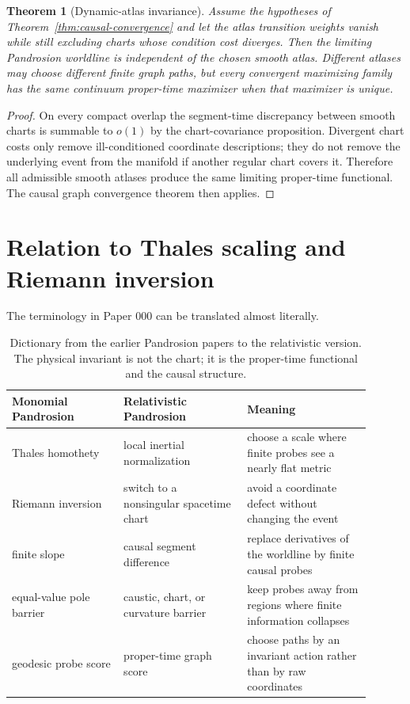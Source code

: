 \documentclass[11pt]{article}
\newtheorem{theorem}[definition]{Theorem}
\begin{document}
\begin{theorem}[Dynamic-atlas invariance]\label{thm:atlas}
Assume the hypotheses of Theorem~\ref{thm:causal-convergence} and let the
atlas transition weights vanish while still excluding charts whose condition
cost diverges.  Then the limiting Pandrosion worldline is independent of the
chosen smooth atlas.  Different atlases may choose different finite graph
paths, but every convergent maximizing family has the same continuum
proper-time maximizer when that maximizer is unique.
\end{theorem}

\begin{proof}
On every compact overlap the segment-time discrepancy between smooth charts is
summable to \(o(1)\) by the chart-covariance proposition.  Divergent chart
costs only remove ill-conditioned coordinate descriptions; they do not remove
the underlying event from the manifold if another regular chart covers it.
Therefore all admissible smooth atlases produce the same limiting proper-time
functional.  The causal graph convergence theorem then applies.
\end{proof}

\section{Relation to Thales scaling and Riemann inversion}

The terminology in Paper 000 can be translated almost literally.

\begin{table}[htbp]
\centering
\renewcommand{\arraystretch}{1.22}
\begin{tabular}{>{\raggedright\arraybackslash}p{0.28\linewidth}>{\raggedright\arraybackslash}p{0.31\linewidth}>{\raggedright\arraybackslash}p{0.31\linewidth}}
\toprule
Monomial Pandrosion & Relativistic Pandrosion & Meaning \\
\midrule
Thales homothety & local inertial normalization & choose a scale where finite probes see a nearly flat metric \\
Riemann inversion & switch to a nonsingular spacetime chart & avoid a coordinate defect without changing the event \\
finite slope & causal segment difference & replace derivatives of the worldline by finite causal probes \\
equal-value pole barrier & caustic, chart, or curvature barrier & keep probes away from regions where finite information collapses \\
geodesic probe score & proper-time graph score & choose paths by an invariant action rather than by raw coordinates \\
\bottomrule
\end{tabular}
\caption{Dictionary from the earlier Pandrosion papers to the relativistic
version.  The physical invariant is not the chart; it is the proper-time
functional and the causal structure.}
\label{tab:dictionary}
\end{table}
\end{document}
